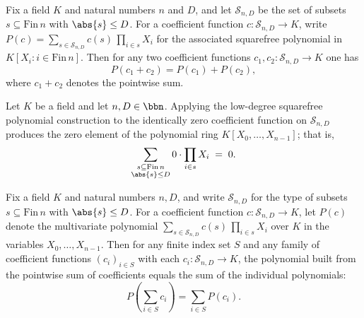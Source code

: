 \begin{lemma}
\label{RazborovSmolensky.lowDegreeSquarefreePolynomial_add}
\leanok
{}
Fix a field $K$ and natural numbers $n$ and $D$, and let $\mathcal{S}_{n,D}$ be the set
of subsets $s \subseteq \mathrm{Fin}\,n$ with $\abs{s} \le D$. For a coefficient
function $c \colon \mathcal{S}_{n,D} \to K$, write $P(c) = \sum_{s \in
\mathcal{S}_{n,D}} c(s)\, \prod_{i \in s} X_i$ for the associated squarefree polynomial
in $K[X_i : i \in \mathrm{Fin}\,n]$. Then for any two coefficient functions $c_1, c_2
\colon \mathcal{S}_{n,D} \to K$ one has \[ P(c_1 + c_2) = P(c_1) + P(c_2), \] where $c_1
+ c_2$ denotes the pointwise sum.
\end{lemma}

\begin{lemma}
\label{RazborovSmolensky.lowDegreeSquarefreePolynomial_zero}
\leanok
{}
Let $K$ be a field and let $n, D \in \bbn$. Applying the low-degree squarefree
polynomial construction to the identically zero coefficient function on
$\mathcal{S}_{n,D}$ produces the zero element of the polynomial ring $K[X_0, \dots,
X_{n-1}]$; that is,
\[
\sum_{\substack{s \subseteq \mathrm{Fin}\,n \\ \abs{s} \le D}} 0 \cdot \prod_{i \in s}
X_i \;=\; 0 .
\]
\end{lemma}

\begin{lemma}
\label{RazborovSmolensky.lowDegreeSquarefreePolynomial_sum}
\leanok
{}
Fix a field $K$ and natural numbers $n, D$, and write $\mathcal{S}_{n,D}$ for the type
of subsets $s \subseteq \mathrm{Fin}\,n$ with $\abs{s} \le D$. For a coefficient
function $c \colon \mathcal{S}_{n,D} \to K$, let $P(c)$ denote the multivariate
polynomial $\sum_{s \in \mathcal{S}_{n,D}} c(s)\, \prod_{i \in s} X_i$ over $K$ in the
variables $X_0, \dots, X_{n-1}$. Then for any finite index set $S$ and any family of
coefficient functions $(c_i)_{i \in S}$ with each $c_i \colon \mathcal{S}_{n,D} \to K$,
the polynomial built from the pointwise sum of coefficients equals the sum of the
individual polynomials:
\[
P\!\left(\sum_{i \in S} c_i\right) = \sum_{i \in S} P(c_i).
\]
\end{lemma}

